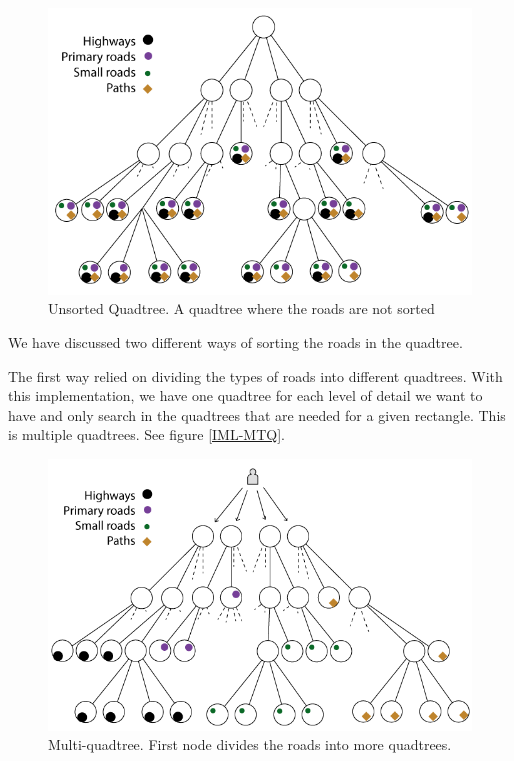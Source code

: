 \begin{figure}[h!]
\centering
\includegraphics[width=1\linewidth]{images/UnsortedQuadtree.png}
\caption{Unsorted Quadtree. A quadtree where the roads are not sorted}
\label{IMPL-USQ}
\end{figure}

We have discussed two different ways of sorting the roads in the quadtree. 

The first way relied on dividing the types of roads into different
quadtrees. With this implementation, we have one quadtree for each level of
detail we want to have and only search in the quadtrees that are needed for a
given rectangle. This is multiple quadtrees. See figure \ref{IML-MTQ}.

\begin{figure}[h!]
\centering
\includegraphics[width=1\linewidth]{images/MultiQuadtree.png}
\caption{Multi-quadtree. First node divides the roads into more
quadtrees.}
\label{IMPL-MTQ}
\end{figure}

